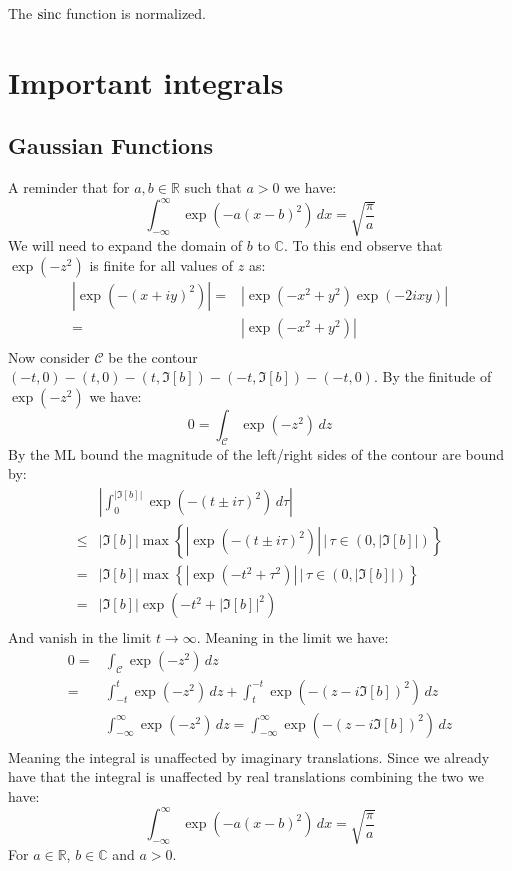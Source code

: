 The $\operatorname{sinc}$ function is normalized.

\section{Important integrals}

\subsection{Gaussian Functions}
A reminder that for $a,b \in \mathbb{R}$ such that $a > 0$ we have:
\[\int_{-\infty}^{\infty}\exp(-a(x-b)^2)\,dx = \sqrt{\frac{\pi}{a}}\]
We will need to expand the domain of $b$ to $\mathbb{{C}}$.
To this end observe that $\exp(-z^2)$ is finite for all values of $z$ as:
\begin{equation*}
\begin{aligned}
	|\exp(-(x+iy)^2)| =& |\exp(-x^2+y^2)\exp(-2ixy)|\\
	=& |\exp(-x^2+y^2)| \\
\end{aligned}
\end{equation*}
Now consider $\mathcal{C}$ be the contour $(-t,0)-(t,0)-(t,\Im[b])-(-t,\Im[b])-(-t,0)$.
By the finitude of $\exp(-z^2)$ we have:
\[0 = \int_\mathcal{C}\exp(-z^2)\,dz \]
By the ML bound the magnitude of the left/right sides of the contour are bound by:
\begin{equation*}
\begin{aligned}
	&\left|\int_{0}^{|\Im[b]|}\exp(-(t\pm i\tau)^2)\,d\tau\right|\\
	\leq&|\Im[b]|\max\left\{|\exp(-(t\pm i\tau)^2)|\,\bigg|\,\tau \in (0,|\Im[b]|)\right\}\\
	=&|\Im[b]|\max\left\{|\exp(-t^2 +\tau^2)|\,\bigg|\,\tau \in (0,|\Im[b]|)\right\}\\
	=&|\Im[b]|\exp(-t^2 +|\Im[b]|^2)\\
\end{aligned}
\end{equation*}
And vanish in the limit $t\rightarrow \infty$.
Meaning in the limit we have:
\begin{equation*}
\begin{aligned}
	0 =& \int_\mathcal{C}\exp(-z^2)\,dz \\
	=& \int_{-t}^{t}\exp(-z^2)\,dz + \int_{t}^{-t}\exp(-(z-i\Im[b])^2)\,dz \\
	&\int_{-\infty}^{\infty}\exp(-z^2)\,dz = \int_{-\infty}^{\infty}\exp(-(z-i\Im[b])^2)\,dz \\
\end{aligned}
\end{equation*}
Meaning the integral is unaffected by imaginary translations.
Since we already have that the integral is unaffected by real translations combining the two we have:
\[\int_{-\infty}^{\infty}\exp(-a(x-b)^2)\,dx = \sqrt{\frac{\pi}{a}}\]
For $a \in \mathbb{R}$, $b \in \mathbb{C}$ and $a > 0$.
\\

